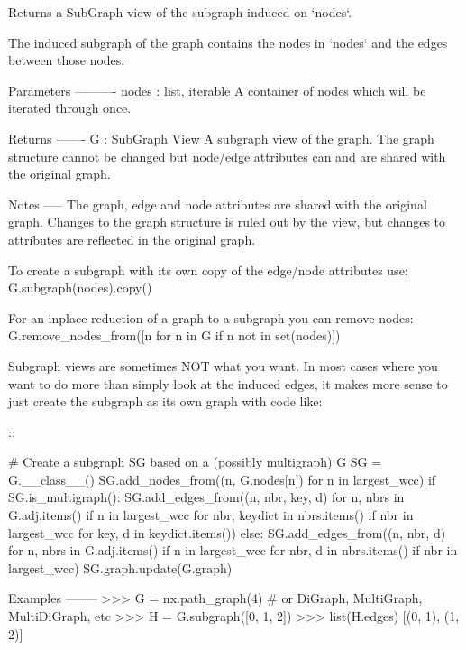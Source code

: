 \begin{DoxyVerb}Returns a SubGraph view of the subgraph induced on `nodes`.

The induced subgraph of the graph contains the nodes in `nodes`
and the edges between those nodes.

Parameters
----------
nodes : list, iterable
    A container of nodes which will be iterated through once.

Returns
-------
G : SubGraph View
    A subgraph view of the graph. The graph structure cannot be
    changed but node/edge attributes can and are shared with the
    original graph.

Notes
-----
The graph, edge and node attributes are shared with the original graph.
Changes to the graph structure is ruled out by the view, but changes
to attributes are reflected in the original graph.

To create a subgraph with its own copy of the edge/node attributes use:
G.subgraph(nodes).copy()

For an inplace reduction of a graph to a subgraph you can remove nodes:
G.remove_nodes_from([n for n in G if n not in set(nodes)])

Subgraph views are sometimes NOT what you want. In most cases where
you want to do more than simply look at the induced edges, it makes
more sense to just create the subgraph as its own graph with code like:

::

    # Create a subgraph SG based on a (possibly multigraph) G
    SG = G.__class__()
    SG.add_nodes_from((n, G.nodes[n]) for n in largest_wcc)
    if SG.is_multigraph():
SG.add_edges_from((n, nbr, key, d)
    for n, nbrs in G.adj.items() if n in largest_wcc
    for nbr, keydict in nbrs.items() if nbr in largest_wcc
    for key, d in keydict.items())
    else:
SG.add_edges_from((n, nbr, d)
    for n, nbrs in G.adj.items() if n in largest_wcc
    for nbr, d in nbrs.items() if nbr in largest_wcc)
    SG.graph.update(G.graph)

Examples
--------
>>> G = nx.path_graph(4)  # or DiGraph, MultiGraph, MultiDiGraph, etc
>>> H = G.subgraph([0, 1, 2])
>>> list(H.edges)
[(0, 1), (1, 2)]
\end{DoxyVerb}
 \mbox{\label{classnetworkx_1_1classes_1_1graph_1_1Graph_a937efdf6cfa28140e34c61b7b5663107}} 
